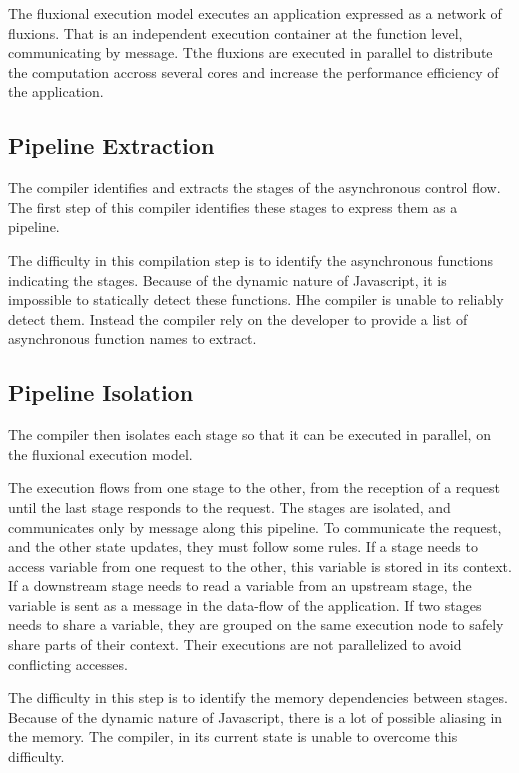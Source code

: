 The fluxional execution model executes an application expressed as a network of fluxions.
That is an independent execution container at the function level, communicating by message.
Tthe fluxions are executed in parallel to distribute the computation accross several cores and increase the performance efficiency of the application.

\subsection{Pipeline Extraction} \label{chapter7:conclusion:extraction}

The compiler identifies and extracts the stages of the asynchronous control flow.
The first step of this compiler identifies these stages to express them as a pipeline.

The difficulty in this compilation step is to identify the asynchronous functions indicating the stages.
Because of the dynamic nature of Javascript, it is impossible to statically detect these functions.
Hhe compiler is unable to reliably detect them.
Instead the compiler rely on the developer to provide a list of asynchronous function names to extract.

\subsection{Pipeline Isolation} \label{chapter7:conclusion:isolation}

The compiler then isolates each stage so that it can be executed in parallel, on the fluxional execution model.

The execution flows from one stage to the other, from the reception of a request until the last stage responds to the request.
The stages are isolated, and communicates only by message along this pipeline.
To communicate the request, and the other state updates, they must follow some rules.
If a stage needs to access variable from one request to the other, this variable is stored in its context.
If a downstream stage needs to read a variable from an upstream stage, the variable is sent as a message in the data-flow of the application.
If two stages needs to share a variable, they are grouped on the same execution node to safely share parts of their context.
Their executions are not parallelized to avoid conflicting accesses.

The difficulty in this step is to identify the memory dependencies between stages.
Because of the dynamic nature of Javascript, there is a lot of possible aliasing in the memory.
The compiler, in its current state is unable to overcome this difficulty.



